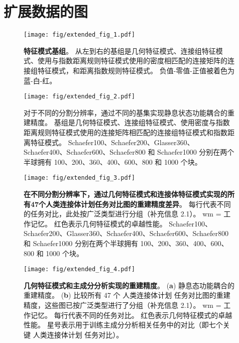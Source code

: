 \documentclass[lang=cn,a4paper,newtx]{elegantpaper}
\begin{document}
\section{扩展数据的图}


\begin{figure}[!htb] 
	\centering
	\texttt{[image: fig/extended\_fig\_1.pdf]}
	\caption{\textbf{特征模式基组}。
		从左到右的基组是几何特征模式、连接组特征模式、使用与指数距离规则特征模式使用的密度相匹配的连接矩阵的连接组特征模式，和距离指数规则特征模式。 
		负值-零值-正值被着色为蓝-白-红。
	} \label{fig:extended_fig_1}
\end{figure}


\begin{figure}[!htb] 
	\centering
	\texttt{[image: fig/extended\_fig\_2.pdf]}
	\caption{对于不同的分割分辨率，通过不同的基集实现静息状态功能耦合的重建精度。 
		基组是几何特征模式、连接组特征模式、使用密度与指数距离规则特征模式使用的连接矩阵相匹配的连接组特征模式和指数距离特征模式。
		Schaefer100、Schaefer200、Glasser360、Schaefer400、Schaefer600、Schaefer800 和 Schaefer1000 分别在两个半球拥有 100、200、360、400、600、800 和 1000 个块。
	} \label{fig:extended_fig_2}
\end{figure}


\begin{figure}[!htb] 
	\centering
	\texttt{[image: fig/extended\_fig\_3.pdf]}
	\caption{\textbf{在不同分割分辨率下，通过几何特征模式和连接体特征模式实现的所有47个人类连接体计划任务对比图的重建精度差异}。
	每行代表不同的任务对比，此处按广泛类型进行分组（补充信息 2.1）。
	wm = 工作记忆。
	红色表示几何特征模式的卓越性能。
	Schaefer100、Schaefer200、Glasser360、Schaefer400、Schaefer600、Schaefer800 和 Schaefer1000 分别在两个半球拥有 100、200、360、400、600、800 和 1000 个块。}
	\label{fig:extended_fig_3}
\end{figure}


\begin{figure}[!htb] 
	\centering
	\texttt{[image: fig/extended\_fig\_4.pdf]}
	\caption{\textbf{几何特征模式和主成分分析实现的重建精度}。
	(\textbf{a}) 静息态功能耦合的重建精度。
	(\textbf{b}) 比较所有 47 个 人类连接体计划 任务对比图的重建精度，这些图已按广泛类型进行了分组（补充信息 2.1）。
	wm = 工作记忆。
	每行代表不同的任务对比。
	红色表示几何特征模式的卓越性能。
	星号表示用于训练主成分分析相关任务中的对比（即七个关键 人类连接体计划 任务对比）。}
	\label{fig:extended_fig_4}
\end{figure}
\end{document}
